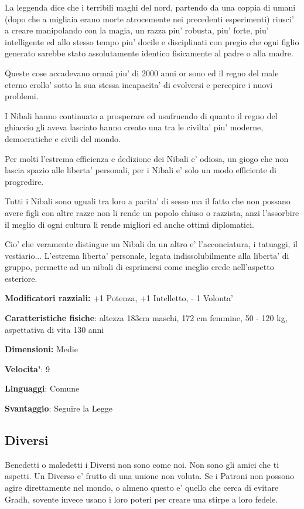 \documentclass[a4paper,11pt,twoside,openany]{dndbook}
\begin{document}
La leggenda dice che i terribili maghi del nord, partendo da una coppia di umani (dopo che a migliaia erano morte atrocemente nei precedenti esperimenti) riusci' a creare manipolando con la magia, un razza piu' robusta, piu' forte, piu' intelligente ed allo stesso tempo piu' docile e disciplinati con pregio che ogni figlio generato sarebbe stato assolutamente identico fisicamente al padre o alla madre.

Queste cose accadevano ormai piu' di 2000 anni or sono ed il regno del male eterno crollo' sotto la sua stessa incapacita' di evolversi e percepire i nuovi problemi.

I Nibali hanno continuato a prosperare ed usufruendo di quanto il regno del ghiaccio gli aveva lasciato hanno creato una tra le civilta' piu' moderne, democratiche e civili del mondo.

Per molti l'estrema efficienza e dedizione dei Nibali e' odiosa, un giogo che non lascia spazio alle liberta' personali, per i Nibali e' solo un modo efficiente di progredire.

Tutti i Nibali sono uguali tra loro a parita' di sesso ma il fatto che non possano avere figli con altre razze non li rende un popolo chiuso o razzista, anzi l'assorbire il meglio di ogni cultura li rende migliori ed anche ottimi diplomatici. 

Cio' che veramente distingue un Nibali da un altro e' l'acconciatura, i tatuaggi, il vestiario... L'estrema liberta' personale, legata indissolubilmente alla liberta' di gruppo, permette ad un nibali di esprimersi come meglio crede nell'aspetto esteriore.

\textbf{Modificatori razziali:} +1 Potenza, +1 Intelletto, - 1 Volonta'

\textbf{Caratteristiche fisiche}: altezza 183cm maschi, 172 cm femmine, 50 - 120 kg, aspettativa di vita 130 anni

\textbf{Dimensioni:} Medie

\textbf{Velocita'}: 9

\textbf{Linguaggi}: Comune

\textbf{Svantaggio}: Seguire la Legge

\subsection{Diversi}

\label{diversi}

Benedetti o maledetti i Diversi non sono come noi. Non sono gli amici che ti aspetti. Un Diverso e' frutto di una unione non voluta. Se i Patroni non possono agire direttamente nel mondo, o almeno questo e' quello che cerca di evitare Gradh, sovente invece usano i loro poteri per creare una stirpe a loro fedele.
\end{document}

